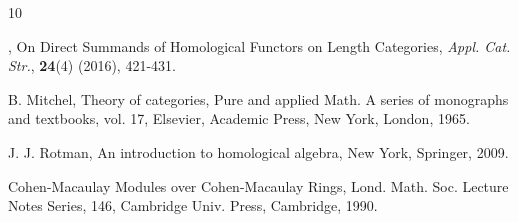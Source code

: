 \documentclass[11pt,a4paper]{amsart}
\def\Ext{\operatorname{{\mathsf{Ext}}}}
\theoremstyle{definition}
\theoremstyle{plain}
\theoremstyle{definition}
\numberwithin{equation}{section}
\begin{document}
\begin{thebibliography}{10}



, On Direct Summands of Homological Functors on Length Categories, {\em  Appl. Cat. Str.}, {\bf 24}(4) (2016), 421-431.


{\sc B. Mitchel,}  Theory of categories, Pure and applied Math. A series of monographs and textbooks, vol. 17, Elsevier, Academic Press, New York, London, 1965.






{\sc J. J. Rotman, } An introduction to homological algebra, 
New York, Springer, 2009.



  Cohen-Macaulay Modules over Cohen-Macaulay Rings,
Lond. Math. Soc. Lecture Notes Series, 146, Cambridge Univ. Press, Cambridge, 1990.


\end{thebibliography}
\end{document}
